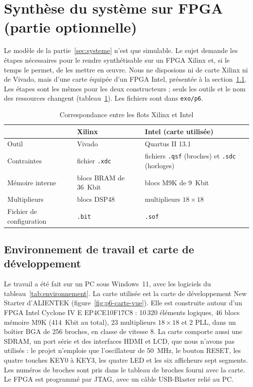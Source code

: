 \section{Synthèse du système sur FPGA (partie optionnelle)}
\label{sec:fpga}

Le modèle de la partie~\ref{sec:systeme} n'est que simulable. Le sujet demande les étapes
nécessaires pour le rendre synthétisable sur un FPGA Xilinx et, si le temps le permet, de les
mettre en œuvre. Nous ne disposions ni de carte Xilinx ni de Vivado, mais d'une carte équipée
d'un FPGA Intel, présentée à la section~\ref{sec:environnement}. Les étapes sont les mêmes
pour les deux constructeurs ; seuls les outils et le nom des ressources changent
(tableau~\ref{tab:xilinx-intel}). Les fichiers sont dans \texttt{exo/p6}.

\begin{table}[H]
\centering
\begin{tabular}{lll}
\toprule
 & Xilinx & Intel (carte utilisée) \\
\midrule
Outil & Vivado & Quartus II 13.1 \\
Contraintes & fichier \texttt{.xdc} & fichiers \texttt{.qsf} (broches) et \texttt{.sdc} (horloges) \\
Mémoire interne & blocs BRAM de 36~Kbit & blocs M9K de 9~Kbit \\
Multiplieurs & blocs DSP48 & multiplieurs $18\times18$ \\
Fichier de configuration & \texttt{.bit} & \texttt{.sof} \\
\bottomrule
\end{tabular}
\caption{Correspondance entre les flots Xilinx et Intel}
\label{tab:xilinx-intel}
\end{table}

\subsection{Environnement de travail et carte de développement}
\label{sec:environnement}

Le travail a été fait sur un PC sous Windows~11, avec les logiciels du
tableau~\ref{tab:environnement}. La carte utilisée est la carte de développement
\og New Starter\fg{} d'ALIENTEK (figure~\ref{fig:p6-carte-vue}). Elle est construite autour
d'un FPGA Intel Cyclone IV E EP4CE10F17C8 : 10\,320 éléments logiques, 46 blocs mémoire M9K
(414~Kbit au total), 23 multiplieurs $18\times18$ et 2 PLL, dans un boîtier BGA de
256 broches, en classe de vitesse 8. La carte comporte aussi une SDRAM, un port série et des
interfaces HDMI et LCD, que nous n'avons pas utilisés : le projet n'emploie que l'oscillateur
de 50~MHz, le bouton RESET, les quatre touches KEY0 à KEY3, les quatre LED et les six
afficheurs sept segments. Les numéros de broches sont pris dans le tableau de broches fourni
avec la carte. Le FPGA est programmé par JTAG, avec un câble USB-Blaster relié au PC.

